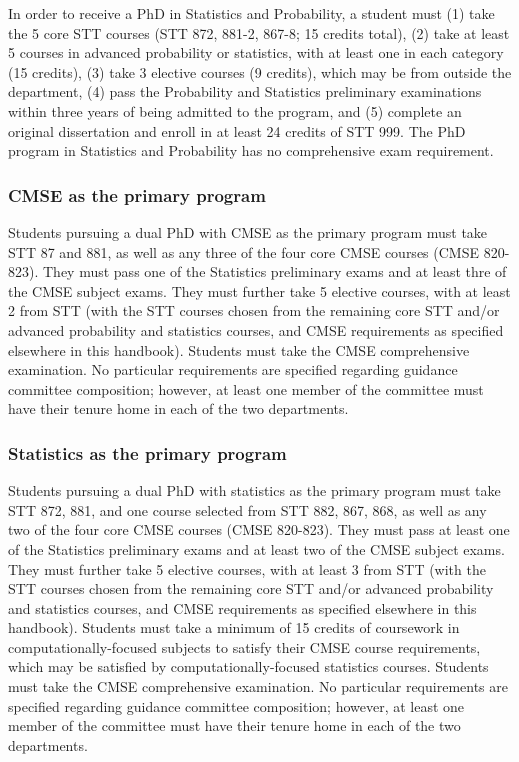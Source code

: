 In order to receive a PhD in Statistics and Probability, a student
must (1) take the 5 core STT courses (STT 872, 881-2, 867-8; 15
credits total), (2) take at least 5 courses in advanced probability or
statistics, with at least one in each category (15 credits), (3) take
3 elective courses (9 credits), which may be from outside the
department, (4) pass the Probability and Statistics preliminary
examinations within three years of being admitted to the program, and
(5) complete an original dissertation and enroll in at least 24
credits of STT 999.  The PhD program in Statistics and Probability has
no comprehensive exam requirement.

\subsubsection{CMSE as the primary program}

Students pursuing a dual PhD with CMSE as the primary program must
take STT 87 and 881, as well as any three of the four core CMSE
courses (CMSE 820-823).  They must pass one of the Statistics
preliminary exams and at least thre of the CMSE subject exams.  They
must further take 5 elective courses, with at least 2 from STT (with
the STT courses chosen from the remaining core STT and/or advanced
probability and statistics courses, and CMSE requirements as specified
elsewhere in this handbook).  Students must take the CMSE
comprehensive examination.  No particular requirements are specified
regarding guidance committee composition; however, at least one member
of the committee must have their tenure home in each of the two
departments.

\subsubsection{Statistics as the primary program}

Students pursuing a dual PhD with statistics as the primary program
must take STT 872, 881, and one course selected from STT 882, 867,
868, as well as any two of the four core CMSE courses (CMSE 820-823).
They must pass at least one of the Statistics preliminary exams and at
least two of the CMSE subject exams.  They must further take 5
elective courses, with at least 3 from STT (with the STT courses
chosen from the remaining core STT and/or advanced probability and
statistics courses, and CMSE requirements as specified elsewhere in
this handbook).  Students must take a minimum of 15 credits of
coursework in computationally-focused subjects to satisfy their CMSE
course requirements, which may be satisfied by computationally-focused
statistics courses.  Students must take the CMSE comprehensive
examination.  No particular requirements are specified regarding
guidance committee composition; however, at least one member of the
committee must have their tenure home in each of the two departments.


